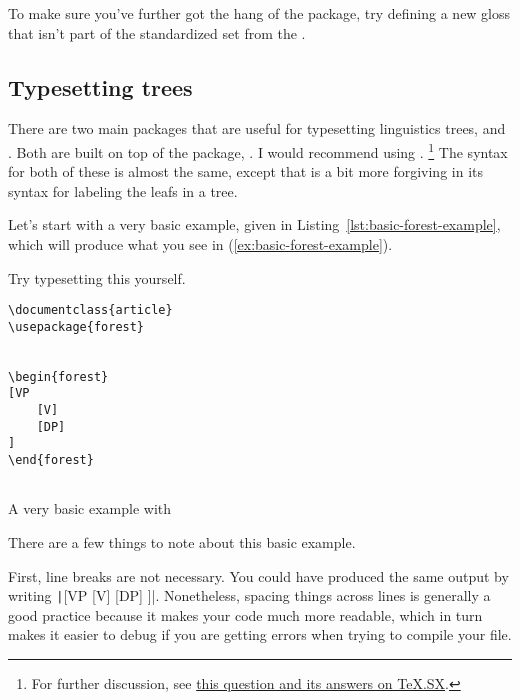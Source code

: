 To make sure you've further got the hang of the  package, try defining a new gloss that isn't part of the standardized set from the \LGR.

\subsection{Typesetting trees}
\label{subsec:typesetting-trees}

There are two main packages that are useful for typesetting linguistics trees,  and .
Both are built on top of the package, .
I would recommend using .%
\footnote{%
For further discussion, see \href{http://tex.stackexchange.com/q/5447/32888}{this question and its answers on TeX.SX}.%
}
The syntax for both of these is almost the same, except that  is a bit more forgiving in its syntax for labeling the leafs in a tree.

Let's start with a very basic example, given in Listing~\ref{lst:basic-forest-example}, which will produce what you see in (\ref{ex:basic-forest-example}).

Try typesetting this yourself.

\begin{exe}
	\label{ex:basic-forest-example}
\end{exe}

\begin{listing}[htbp]
	\centering
	\begin{verbatim}
\documentclass{article}
\usepackage{forest}


\begin{forest}
[VP
    [V]
    [DP]
]
\end{forest}


	\end{verbatim}
	\caption{A very basic example with }
	\label{lst:basic-forest-example}
\end{listing}

There are a few things to note about this basic example.

First, line breaks are not necessary.
You could have produced the same output by writing \texttt|[VP [V] [DP] ]|.
Nonetheless, spacing things across lines is generally a good practice because it makes your code much more readable, which in turn makes it easier to debug if you are getting errors when trying to compile your file.

